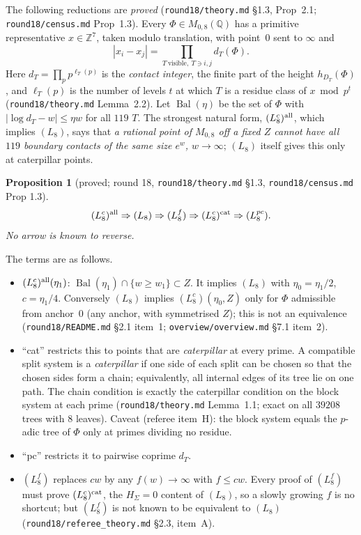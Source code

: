 \documentclass[11pt]{article}
\newtheorem{proposition}[theorem]{Proposition}
\newcommand{\Z}{\mathbb Z}
\newcommand{\Q}{\mathbb Q}
\newcommand{\Bal}{\operatorname{Bal}}
\newcommand{\rec}[1]{\texttt{#1}}
\begin{document}
The following reductions are \emph{proved} (\rec{round18/theory.md} \S1.3,
Prop~2.1; \rec{round18/census.md} Prop~1.3).  Every \(\Phi\in M_{0,8}(\Q)\) has
a primitive representative \(x\in\Z^7\), taken modulo translation, with
point~\(0\) sent to \(\infty\) and
\[
  |x_i-x_j|=\prod_{T\ \text{visible},\ T\ni i,j}d_T(\Phi).
\]
Here \(d_T=\prod_pp^{\ell_T(p)}\) is the \emph{contact integer}, the finite part
of the height \(h_{D_T}(\Phi)\), and \(\ell_T(p)\) is the number of levels \(t\)
at which \(T\) is a residue class of \(x\bmod p^t\) (\rec{round18/theory.md}
Lemma~2.2).  Let \(\Bal(\eta)\) be the set of \(\Phi\) with
\(|\log d_T-w|\le\eta w\) for all \(119\) \(T\).  The strongest natural form,
\((L_8^c)^{\rm all}\), which implies \((L_8)\), says that \emph{a rational point
of \(M_{0,8}\) off a fixed \(Z\) cannot have all \(119\) boundary contacts of
the same size \(e^{w}\), \(w\to\infty\)}; \((L_8)\) itself gives this only at
caterpillar points.

\begin{proposition}[proved; round 18, \rec{round18/theory.md} \S1.3, \rec{round18/census.md} Prop 1.3]\label{prop:sandwich}
\[
  (L_8^c)^{\rm all}\Rightarrow(L_8)\Rightarrow(L_8^f)\Rightarrow(L_8^c)^{\rm cat}\Rightarrow(L_8^{pc}).
\]
No arrow is known to reverse.
\end{proposition}

The terms are as follows.
\begin{itemize}[leftmargin=2em]
  \item \((L_8^c)^{\rm all}(\eta_1)\): \(\Bal(\eta_1)\cap\{w\ge w_1\}\subset Z\).
    It implies \((L_8)\) with \(\eta_0=\eta_1/2\), \(c=\eta_1/4\).  Conversely
    \((L_8)\) implies \((L_8^c)(\eta_0,Z)\) only for \(\Phi\) admissible from
    anchor~\(0\) (any anchor, with symmetrised \(Z\)); this is not an
    equivalence (\rec{round18/README.md} \S2.1 item~1;
    \rec{overview/overview.md} \S7.1 item~2).
  \item ``cat'' restricts this to points that are \emph{caterpillar} at every
    prime.  A compatible split system is a \emph{caterpillar} if one side of
    each split can be chosen so that the chosen sides form a chain;
    equivalently, all internal edges of its tree lie on one path.  The chain
    condition is exactly the caterpillar condition on the block system at each
    prime (\rec{round18/theory.md} Lemma~1.1; exact on all \(39208\) trees with
    \(8\) leaves).  Caveat (referee item~H): the block system equals the
    \(p\)-adic tree of \(\Phi\) only at primes dividing no residue.
  \item ``pc'' restricts it to pairwise coprime \(d_T\).
  \item \((L_8^f)\) replaces \(cw\) by any \(f(w)\to\infty\) with \(f\le cw\).
    Every proof of \((L_8^f)\) must prove \((L_8^c)^{\rm cat}\), the
    \(H_\Sigma=0\) content of \((L_8)\), so a slowly growing \(f\) is no
    shortcut; but \((L_8^f)\) is not known to be equivalent to \((L_8)\)
    (\rec{round18/referee\_theory.md} \S2.3, item~A).
\end{itemize}
\end{document}
